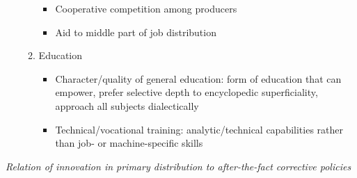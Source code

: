 \begin{itemize}
\begin{enumerate}
    \begin{itemize}
    \tightlist
    \item
      Cooperative competition among producers
    \item
      Aid to middle part of job distribution
    \end{itemize}
  \item
    Education

    \begin{itemize}
    \tightlist
    \item
      Character/quality of general education: form of education that can
      empower, prefer selective depth to encyclopedic superficiality,
      approach all subjects dialectically
    \item
      Technical/vocational training: analytic/technical capabilities
      rather than job- or machine-specific skills
    \end{itemize}
  \end{enumerate}
\end{itemize}

\emph{Relation of innovation in primary distribution to after-the-fact
corrective policies}

